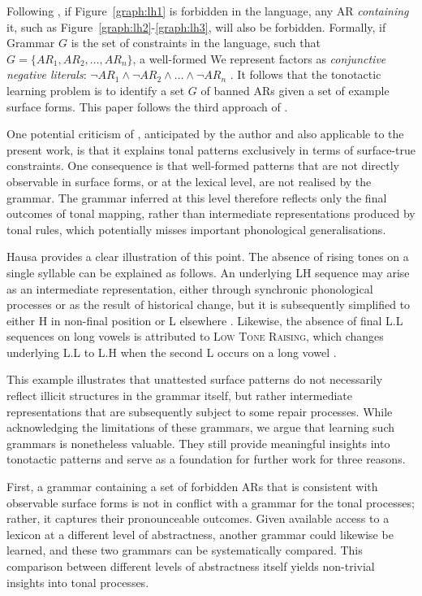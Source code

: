 \documentclass{CUP-JNL-PHO}%
\theoremstyle{definition}
\numberwithin{equation}{section}
\theoremstyle{definition}
\begin{document}
Following \citet{jardine2017LocalNature}, if
Figure~\ref{graph:lh1} is forbidden in the language, any AR
\textit{containing} it, such as
Figure~\ref{graph:lh2}-\ref{graph:lh3}, will also be
forbidden. Formally, if Grammar $G$ is the set of constraints in the
language, such that \(G = \{AR_1, AR_2, \ldots, AR_n\}\), a well-formed
We represent factors as \emph{conjunctive negative literals}:
\(\lnot AR_1 \land \lnot AR_2 \land \ldots \land \lnot AR_n\)
\citep{jardine2017LocalNature,rogers.lambert2019mol}. It follows that
the tonotactic learning problem is to identify a set \(G\) of banned
ARs given a set of example surface forms. This paper follows the third
approach of \citet{jardine2017LocalNature}.  
%

One potential criticism of \citet{jardine2017LocalNature}, anticipated
by the author and also applicable to the present work, is that it
explains tonal patterns exclusively in terms of surface-true
constraints. One consequence is that well-formed patterns that are not
directly observable in surface forms, or at the lexical level, are not
realised by the grammar. The grammar inferred at this level therefore
reflects only the final outcomes of tonal mapping, rather than
intermediate representations produced by tonal rules, which
potentially misses important phonological generalisations.

Hausa provides a clear illustration of this point. The absence 
of rising tones on a single syllable can be explained as follows. 
An underlying LH sequence may arise as an intermediate representation, 
either through synchronic phonological processes or as the result of 
historical change, but it is subsequently simplified to either H in non-final 
position or L elsewhere \citep{Leben,Newmanbook}. Likewise, the absence of final 
L.L sequences on long vowels is attributed to \textsc{Low Tone Raising}, which 
changes underlying L.L to L.H when the second L occurs on a long vowel \citep{Leben,leben1996tonal}.

This example illustrates that unattested surface patterns do not
necessarily reflect illicit structures in the grammar itself, but
rather intermediate representations that are subsequently subject to
some repair processes. While acknowledging the limitations of these
grammars, we argue that learning such grammars is nonetheless
valuable. They still provide meaningful insights into tonotactic
patterns and serve as a foundation for further work for three reasons.

First, a grammar containing a set of forbidden ARs that is consistent
with observable surface forms is not in conflict with a grammar for
the tonal processes; rather, it captures their pronounceable
outcomes. Given available access to a lexicon at a
different level of abstractness, another grammar could likewise be
learned, and these two grammars can be systematically compared. This
comparison between different levels of abstractness itself yields
non-trivial insights into tonal processes.
\end{document}
